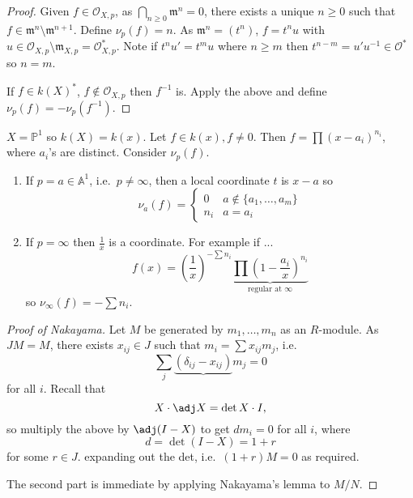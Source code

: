 \documentclass[a4paper]{article}
\renewcommand{\A}{\mathbb{A}}
\renewcommand*{\P}{\mathbb{P}}
\begin{document}
\begin{proof}
  Given \(f \in \mathcal O_{X, p}\), as \(\bigcap_{n \geq 0} \mathfrak m^n = 0\), there exists a unique \(n \geq 0\) such that \(f \in \mathfrak m^n \setminus \mathfrak m^{n + 1}\). Define \(\nu_p(f) = n\). As \(\mathfrak m^n = (t^n)\), \(f = t^n u\) with \(u \in \mathcal O_{X, p} \setminus \mathfrak m_{X, p} = \mathcal O_{X, p}^*\). Note if \(t^n u' = t^m u\) where \(n \geq m\) then \(t^{n - m} = u' u^{-1} \in \mathcal O^*\) so \(n = m\).

  If \(f \in k(X)^*\), \(f \notin \mathcal O_{X, p}\) then \(f^{-1}\) is. Apply the above and define \(\nu_p(f) = - \nu_p(f^{-1})\).
\end{proof}

\begin{eg}
  \(X = \P^1\) so \(k(X) = k(x)\). Let \(f \in k(x), f \neq 0\). Then \(f = \prod (x - a_i)^{n_i}\), where \(a_i\)'s are distinct. Consider \(\nu_p(f)\).
  \begin{enumerate}
  \item If \(p = a \in \A^1\), i.e.\ \(p \neq \infty\), then a local coordinate \(t\) is \(x - a\) so
    \[
      \nu_a(f) =
      \begin{cases}
        0 & a \notin \{a_1, \dots, a_m\} \\
        n_i & a = a_i
      \end{cases}
    \]
  \item If \(p = \infty\) then \(\frac{1}{x}\) is a coordinate. For example if ...
    \[
      f(x) = (\frac{1}{x})^{- \sum n_i} \underbrace{\prod (1 - \frac{a_i}{x})^{n_i}}_{\text{regular at } \infty}
    \]
    so \(\nu_\infty(f) = - \sum n_i\).
  \end{enumerate}
\end{eg}

\begin{proof}[Proof of Nakayama]
  Let \(M\) be generated by \(m_1, \dots, m_n\) as an \(R\)-module. As \(JM = M\), there exists \(x_{ij} \in J\) such that \(m_i = \sum x_{ij} m_j\), i.e.
  \[
    \sum_j \underbrace{(\delta_{ij} - x_{ij})} m_j = 0
  \]
  for all \(i\). Recall that
  \[
    X \cdot \adj X = \det X \cdot I,
  \]
  so multiply the above by \(\adj (I - X)\) to get \(d m_i = 0\) for all \(i\), where
  \[
    d = \det (I - X) = 1 + r
  \]
  for some \(r \in J\). expanding out the det, i.e.\ \((1 + r)M = 0\) as required.

  The second part is immediate by applying Nakayama's lemma to \(M/N\).
\end{proof}
\end{document}
